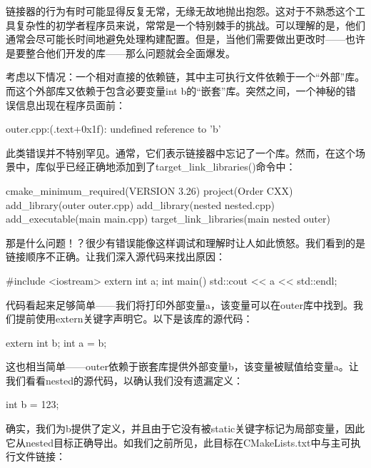 
链接器的行为有时可能显得反复无常，无缘无故地抛出抱怨。这对于不熟悉这个工具复杂性的初学者程序员来说，常常是一个特别棘手的挑战。可以理解的是，他们通常会尽可能长时间地避免处理构建配置。但是，当他们需要做出更改时——也许是要整合他们开发的库——那么问题就会全面爆发。

考虑以下情况：一个相对直接的依赖链，其中主可执行文件依赖于一个“外部”库。而这个外部库又依赖于包含必要变量int b的“嵌套”库。突然之间，一个神秘的错误信息出现在程序员面前：

\begin{shell}
outer.cpp:(.text+0x1f): undefined reference to 'b'
\end{shell}

此类错误并不特别罕见。通常，它们表示链接器中忘记了一个库。然而，在这个场景中，库似乎已经正确地添加到了target\_link\_libraries()命令中：


\begin{cmake}
cmake_minimum_required(VERSION 3.26)
project(Order CXX)
add_library(outer outer.cpp)
add_library(nested nested.cpp)
add_executable(main main.cpp)
target_link_libraries(main nested outer)
\end{cmake}

那是什么问题！？很少有错误能像这样调试和理解时让人如此愤怒。我们看到的是链接顺序不正确。让我们深入源代码来找出原因：


\begin{cmake}
#include <iostream>
extern int a;
int main() {
    std::cout << a << std::endl;
}
\end{cmake}

代码看起来足够简单——我们将打印外部变量a，该变量可以在outer库中找到。我们提前使用extern关键字声明它。以下是该库的源代码：


\begin{cmake}
extern int b;
int a = b;
\end{cmake}

这也相当简单——outer依赖于嵌套库提供外部变量b，该变量被赋值给变量a。让我们看看nested的源代码，以确认我们没有遗漏定义：


\begin{cmake}
int b = 123;
\end{cmake}

确实，我们为b提供了定义，并且由于它没有被static关键字标记为局部变量，因此它从nested目标正确导出。如我们之前所见，此目标在CMakeLists.txt中与主可执行文件链接：

